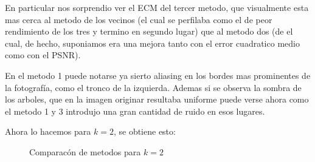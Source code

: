 En particular nos sorprendio ver el ECM del tercer metodo, que visualmente esta mas cerca al metodo de los vecinos (el cual se perfilaba como el de peor rendimiento de los tres y termino en segundo lugar) que al metodo dos (de el cual, de hecho, suponiamos era una mejora tanto con el error cuadratico medio como con el PSNR).

En el metodo 1 puede notarse ya sierto aliasing en los bordes mas prominentes de la fotografía, como el tronco de la izquierda. Ademas si se observa la sombra de los arboles, que en la imagen originar resultaba uniforme puede verse ahora como el metodo 1 y 3 introdujo una gran cantidad de ruido en esos lugares.

Ahora lo hacemos para $k=2$, se obtiene esto:

\begin{figure}[H]
    \centering
    \qquad
    \qquad
    \caption{Comparacón de metodos para $k = 2$}
    \label{fig:example}%
\end{figure}

